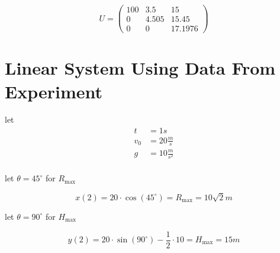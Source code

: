 \begin{equation}
	U = \begin{pmatrix}
		100 & 3.5   & 15      \\
		0   & 4.505 & 15.45   \\
		0   & 0     & 17.1976
	\end{pmatrix}
\end{equation}

\section{Linear System Using Data From Experiment}

let
\begin{align*}
	t   & = 1s               \\
	v_0 & = 20 \frac{m}{s}   \\
	g   & = 10 \frac{m}{s^2} \\
\end{align*}

\noindent let $\theta = 45^{\circ}$ for $R_{\max}$

\begin{equation}
	x(2) = 20 \cdot \cos(45^{\circ}) = R_{\max} = 10 \sqrt{2} m
\end{equation}

\noindent let $\theta = 90^{\circ}$ for $H_{\max}$

\begin{equation}
	y(2) = 20 \cdot \sin(90^{\circ}) - \frac{1}{2} \cdot 10 = H_{\max} = 15 m
\end{equation}

\newpage
\thispagestyle{plain}

